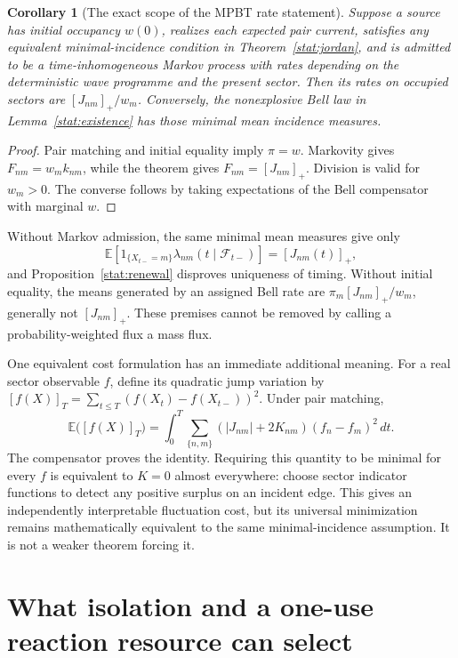 \documentclass[11pt,oneside,openany]{book}
\newtheorem{corollary}[theorem]{Corollary}
\theoremstyle{definition}
\theoremstyle{remark}\newtheorem{remark}[theorem]{Remark}
\begin{document}
\begin{corollary}[The exact scope of the MPBT rate statement]
\label{stat:mpbt}
Suppose a source has initial occupancy $w(0)$, realizes each expected pair
current, satisfies any equivalent minimal-incidence condition in
Theorem~\ref{stat:jordan}, and is admitted to be a time-inhomogeneous Markov
process with rates depending on the deterministic wave programme and the
present sector. Then its rates on occupied sectors are
$[J_{nm}]_+/w_m$. Conversely, the nonexplosive Bell law in
Lemma~\ref{stat:existence} has those minimal mean incidence measures.
\end{corollary}
\begin{proof}
Pair matching and initial equality imply $\pi=w$. Markovity gives
$F_{nm}=w_m k_{nm}$, while the theorem gives $F_{nm}=[J_{nm}]_+$.
Division is valid for $w_m>0$. The converse follows by taking expectations
of the Bell compensator with marginal $w$.
\end{proof}

Without Markov admission, the same minimal mean measures give only
\[
 \mathbb E\left[1_{\{X_{t-}=m\}}
       \lambda_{nm}(t\mid\mathcal F_{t-})\right]=[J_{nm}(t)]_+,
\]
and Proposition~\ref{stat:renewal} disproves uniqueness of timing.
Without initial equality, the means generated by an assigned Bell rate are
$\pi_m[J_{nm}]_+/w_m$, generally not $[J_{nm}]_+$. These premises cannot be
removed by calling a probability-weighted flux a mass flux.

One equivalent cost formulation has an immediate additional meaning. For a
real sector observable $f$, define its quadratic jump variation by
$[f(X)]_T=\sum_{t\leq T}(f(X_t)-f(X_{t-}))^2$. Under pair matching,
\begin{equation}\label{stat:quadratic-activity}
 \mathbb E\bigl([f(X)]_T\bigr)
 =\int_0^T\sum_{\{n,m\}}
       (|J_{nm}|+2K_{nm})(f_n-f_m)^2\,dt.
\end{equation}
The compensator proves the identity. Requiring this quantity to be minimal
for every $f$ is equivalent to $K=0$ almost everywhere: choose sector
indicator functions to detect any positive surplus on an incident edge.
This gives an independently interpretable fluctuation cost, but its
universal minimization remains mathematically equivalent to the same
minimal-incidence assumption. It is not a weaker theorem forcing it.

\section{What isolation and a one-use reaction resource can select}
\end{document}
